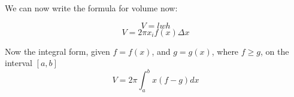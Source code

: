 We can now write the formula for volume now: 

\begin{equation}
	V = lwh 
\end{equation}
\begin{equation}
	V = 2\pi x_i f(x) \Delta x 
\end{equation}

Now the integral form, given $f=f(x)$, and $g = g(x)$, where $f\geq g$, on the 
interval $[a, b]$
\begin{equation}
	V = 2\pi \int_a^b{x(f-g)}dx
\end{equation}